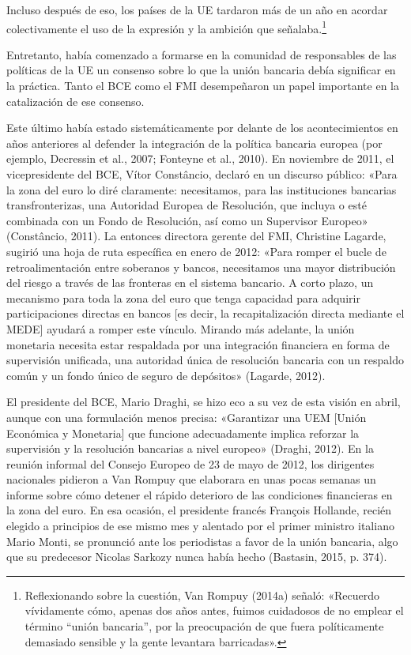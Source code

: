 \documentclass[10pt,a4paper]{article}
\begin{document}
{Incluso después de eso, los países de la UE tardaron más de un año en acordar colectivamente el uso de la expresión y la ambición que señalaba.\footnote{
Reflexionando sobre la cuestión, Van Rompuy (2014a) señaló: «Recuerdo vívidamente cómo, apenas dos años antes, fuimos cuidadosos de no emplear el término “unión bancaria”, por la preocupación de que fuera políticamente demasiado sensible y la gente levantara barricadas».
}

Entretanto, había comenzado a formarse en la comunidad de responsables de las políticas de la UE un consenso sobre lo que la unión bancaria debía significar en la práctica. Tanto el BCE como el FMI desempeñaron un papel importante en la catalización de ese consenso.

Este último había estado sistemáticamente por delante de los acontecimientos en años anteriores al defender la integración de la política bancaria europea (por ejemplo, Decressin et al., 2007; Fonteyne et al., 2010). En noviembre de 2011, el vicepresidente del BCE, Vítor Constâncio, declaró en un discurso público: «Para la zona del euro lo diré claramente: necesitamos, para las instituciones bancarias transfronterizas, una Autoridad Europea de Resolución, que incluya o esté combinada con un Fondo de Resolución, así como un Supervisor Europeo» (Constâncio, 2011). La entonces directora gerente del FMI, Christine Lagarde, sugirió una hoja de ruta específica en enero de 2012: «Para romper el bucle de retroalimentación entre soberanos y bancos, necesitamos una mayor distribución del riesgo a través de las fronteras en el sistema bancario. A corto plazo, un mecanismo para toda la zona del euro que tenga capacidad para adquirir participaciones directas en bancos [es decir, la recapitalización directa mediante el MEDE] ayudará a romper este vínculo. Mirando más adelante, la unión monetaria necesita estar respaldada por una integración financiera en forma de supervisión unificada, una autoridad única de resolución bancaria con un respaldo común y un fondo único de seguro de depósitos» (Lagarde, 2012).

El presidente del BCE, Mario Draghi, se hizo eco a su vez de esta visión en abril, aunque con una formulación menos precisa: «Garantizar una UEM [Unión Económica y Monetaria] que funcione adecuadamente implica reforzar la supervisión y la resolución bancarias a nivel europeo» (Draghi, 2012). En la reunión informal del Consejo Europeo de 23 de mayo de 2012, los dirigentes nacionales pidieron a Van Rompuy que elaborara en unas pocas semanas un informe sobre cómo detener el rápido deterioro de las condiciones financieras en la zona del euro. En esa ocasión, el presidente francés François Hollande, recién elegido a principios de ese mismo mes y alentado por el primer ministro italiano Mario Monti, se pronunció ante los periodistas a favor de la unión bancaria, algo que su predecesor Nicolas Sarkozy nunca había hecho (Bastasin, 2015, p. 374).

}
\end{document}
